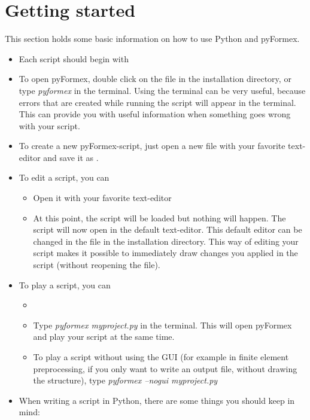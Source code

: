 \documentclass[a4paper]{manual}
\newcommand{\pyformex}{pyFormex\xspace}
\begin{document}
{%
\section{Getting started}
\label{sec:getting-started}
This section holds some basic information on how to use Python and \pyformex. 

\begin{itemize}
\item Each script should begin with 
\item To open \pyformex, double click on the file  in the installation directory, or type \emph{pyformex} in the terminal. Using the terminal can be very useful, because errors that are created while running the script will appear in the terminal. This can provide you with useful information when something goes wrong with your script.
\item To create a new \pyformex-script, just open a new file with your favorite text-editor and save it as .
\item To edit a script, you can
	\begin{itemize}
	\item Open it with your favorite text-editor
	\item {}
	At this point, the script will be loaded but nothing will happen. 
	The script will now open in the default text-editor. This default editor can be changed in the  file in the 		installation directory.
	This way of editing your script makes it possible to immediately draw changes you applied in the script (without reopening 		the file).  
	\end{itemize}
\item To play a script, you can
	\begin{itemize}
	\item {}\\
	\item Type \emph{pyformex myproject.py} in the terminal. This will open \pyformex and play your script at the same time.
	\item To play a script without using the GUI (for example in finite element preprocessing, if you only want to write an 		output file, without drawing the structure), type \emph{pyformex --nogui myproject.py}
	\end{itemize}
\item When writing a script in Python, there are some things you should keep in mind:

\end{itemize}}
\end{document}
